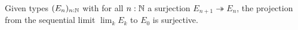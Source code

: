 \begin{axiom}\label{axDependentChoice}
Given types $(E_n)_{n:\mathbb{N}}$ with for all $n:\mathbb{N}$ a surjection $E_{n+1}\twoheadrightarrow E_n$, the projection from the sequential limit $\lim_kE_k$ to $E_0$ is surjective.
\end{axiom}
